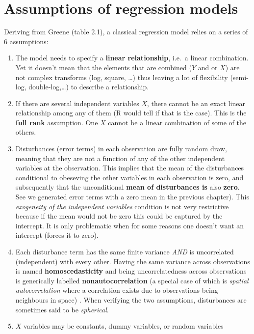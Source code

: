 \documentclass[
  letterpaper,
  DIV=11,
  numbers=noendperiod]{scrreprt}
\begin{document}
\section{Assumptions of regression
models}\label{assumptions-of-regression-models}

Deriving from Greene (table 2.1), a classical regression model relies on
a series of 6 assumptions:

\begin{enumerate}
\def\labelenumi{\arabic{enumi}.}
\item
  The model needs to specify a \textbf{linear relationship}, i.e.~a
  linear combination. Yet it doesn't mean that the elements that are
  combined (\(Y\) and or \(X\)) are not complex transforms (log, square,
  \ldots) thus leaving a lot of flexibility (semi-log,
  double-log,\ldots) to describe a relationship.
\item
  If there are several independent variables \(X\), there cannot be an
  exact linear relationship among any of them (R would tell if that is
  the case). This is the \textbf{full rank} assumption. One \(X\) cannot
  be a linear combination of some of the others.
\item
  Disturbances (error terms) in each observation are fully random draw,
  meaning that they are not a function of any of the other independent
  variables at the observation. This implies that the mean of the
  disturbances conditional to obeseving the other variables in each
  observation is zero, and subsequently that the unconditional
  \textbf{mean of disturbances is} also \textbf{zero}. See we generated
  error terms with a zero mean in the previous chapter). This
  \emph{exogeneity of the independent variables} condition is not very
  restrictive because if the mean would not be zero this could be
  captured by the intercept. It is only problematic when for some
  reasons one doesn't want an intercept (forces it to zero).
\item
  Each disturbance term has the same finite variance \emph{AND} is
  uncorrelated (independent) with every other. Having the same variance
  across observations is named \textbf{homoscedasticity} and being
  uncorrelatedness across observations is generically labelled
  \textbf{nonautocorrelation} (a special case of which is \emph{spatial
  autocorrelation} where a correlation exists due to observations being
  neighbours in space) . When verifying the two assumptions,
  disturbances are sometimes said to be \emph{spherical}.
\item
  \(X\) variables may be constants, dummy variables, or random variables

\end{enumerate}
\end{document}
